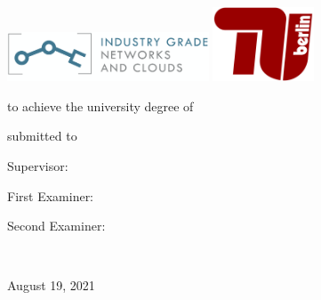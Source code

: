 

\begin{titlepage}

{\sffamily

\begin{center}

\includegraphics[width=60mm]{figures/logo-ignc.png}
\includegraphics[width=30mm]{figures/TU-Berlin-Logo.svg.png}

\vfill\vfill\vfill
\vfill\vfill\vfill

\myauthor

\vfill\vfill\vfill

{\LARGE\bfseries\mytitle}


\vfill\vfill\vfill
\vfill\vfill\vfill


{\bfseries\large\myworktitle}

to achieve the university degree of

\mygrade

\mydegreeprogramme


\vfill\vfill\vfill


submitted to

\vfill

{\bfseries\large\myuniversity}


\vfill\vfill\vfill


Supervisor: \mysupervisor

First Examiner: \myfirstexaminer

Second Examiner: \mysecondexaminer

\vfill

\myinstitute\\

\vfill



\vfill\vfill\vfill


August 19, 2021

\end{center}
}%
\end{titlepage}


